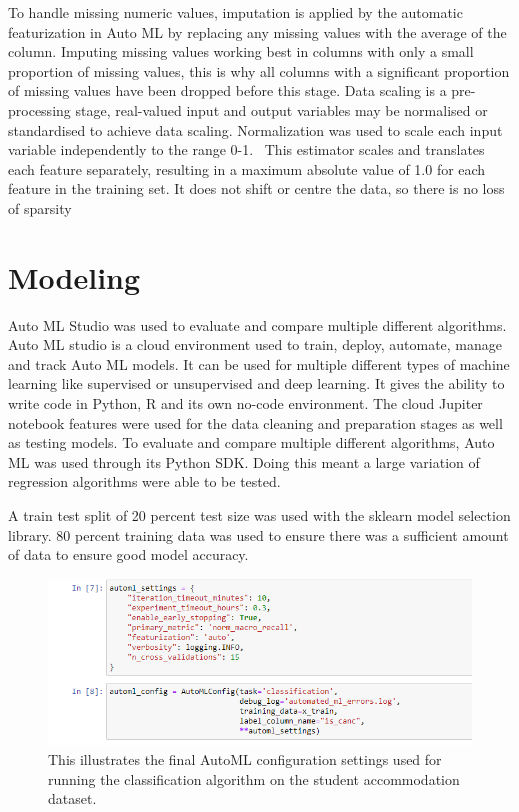 To handle missing numeric values, imputation is applied by the automatic featurization in Auto ML by replacing any missing values with the average of the column. Imputing missing values working best in columns with only a small proportion of missing values, this is why all columns with a significant proportion of missing values have been dropped before this stage. Data scaling is a pre-processing stage, real-valued input and output variables may be normalised or standardised to achieve data scaling. Normalization was used to scale each input variable independently to the range 0-1.  This estimator scales and translates each feature separately, resulting in a maximum absolute value of 1.0 for each feature in the training set. It does not shift or centre the data, so there is no loss of sparsity \cite{Singh2019MLlib:Library,Sklearn.preprocessing.MaxAbsScalerDocumentation}

\section{Modeling}

Auto ML Studio was used to evaluate and compare multiple different algorithms. Auto ML studio is a cloud environment used to train, deploy, automate, manage and track Auto ML models. It can be used for multiple different types of machine learning like supervised or unsupervised and deep learning. It gives the ability to write code in Python, R and its own no-code environment.  The cloud Jupiter notebook features were used for the data cleaning and preparation stages as well as testing models. To evaluate and compare multiple different algorithms, Auto ML was used through its Python SDK. Doing this meant a large variation of regression algorithms were able to be tested.

\vspace{5mm}

A train test split of 20 percent test size  was used with the sklearn model selection library. 80 percent training data was used to ensure there was a sufficient amount of data to ensure good model accuracy. 

\begin{figure}[H]
 \centering
 \includegraphics[width=15cm]{figures/auto_ml_settings.png}
 \caption{This illustrates the final AutoML configuration settings used for running the classification algorithm on the student accommodation dataset.}
\end{figure}

